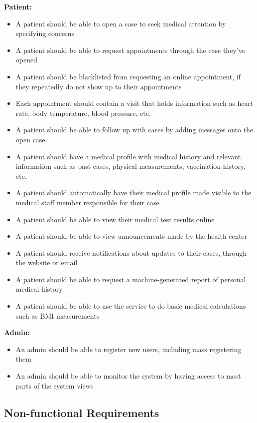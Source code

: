 \documentclass[a4paper, 12pt, titlepage]{article}
\begin{document}
  \textbf{Patient:}
  \begin{itemize}
    \item A patient should be able to open a case to seek medical attention by specifying concerns
    \item A patient should be able to request appointments through the case they've opened
    \item A patient should be blacklisted from requesting an online appointment, if they repeatedly do not show up to their appointments
    \item Each appointment should contain a visit that holds information such as heart rate, body temperature, blood pressure, etc.
    \item A patient should be able to follow up with cases by adding messages onto the open case
    \item A patient should have a medical profile with medical history and relevant information such as past cases, physical measurements, vaccination history, etc.
    \item A patient should automatically have their medical profile made visible to the medical staff member responsible for their case
    \item A patient should be able to view their medical test results online
    \item A patient should be able to view announcements made by the health center
    \item A patient should receive notifications about updates to their cases, through the website or email
    \item A patient should be able to request a machine-generated report of personal medical history
    \item A patient should be able to use the service to do basic medical calculations such as BMI measurements
  \end{itemize}

  \textbf{Admin:}
  \begin{itemize}
    \item An admin should be able to register new users, including mass registering them
    \item An admin should be able to monitor the system by having access to most parts of the system views
  \end{itemize}

  \subsection{Non-functional Requirements}
\end{document}
